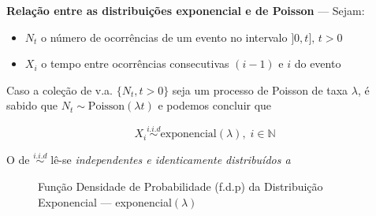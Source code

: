 \noindent\textbf{Relação entre as distribuições exponencial e de Poisson} --- Sejam:

\begin{itemize}
    \item $N_t$ o número de ocorrências de um evento no intervalo $]0,t],\, t > 0$
    \item $X_i$ o tempo entre ocorrências consecutivas $(i -1)$ e $i$ do evento
\end{itemize}

\noindent Caso a coleção de v.a. $\{N_t, t > 0\}$ seja um processo de Poisson de taxa $\lambda$, é sabido que $N_t \sim \text{Poisson}(\lambda t)$ e podemos concluir que

$$
    \boxed{X_i \overset{i.i.d}{\sim} \text{exponencial}(\lambda),\; i \in \mathbb{N}}
$$

\noindent O de $\overset{i.i.d}{\sim}$ lê-se \textit{independentes e identicamente distribuídos a}

\begin{figure}[H]
    \centering
     \caption{Função Densidade de Probabilidade (f.d.p) da Distribuição Exponencial --- exponencial$(\lambda)$}
\end{figure}

